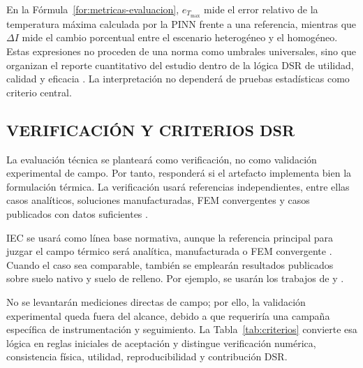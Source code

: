 \documentclass[11pt,a4paper,oneside]{report}
\begin{document}
En la Fórmula~\ref{for:metricas-evaluacion}, $e_{T_{\max}}$ mide el error relativo de la temperatura máxima calculada por la PINN frente a una referencia, mientras que $\Delta I$ mide el cambio porcentual entre el escenario heterogéneo y el homogéneo. Estas expresiones no proceden de una norma como umbrales universales, sino que organizan el reporte cuantitativo del estudio dentro de la lógica DSR de utilidad, calidad y eficacia \parencite[350--351]{gregor2013}. La interpretación no dependerá de pruebas estadísticas como criterio central.

\subsection{VERIFICACIÓN Y CRITERIOS DSR}
\label{subsec:verificacion-dsr}

La evaluación técnica se planteará como verificación, no como validación experimental de campo. Por tanto, responderá si el artefacto implementa bien la formulación térmica. La verificación usará referencias independientes, entre ellas casos analíticos, soluciones manufacturadas, FEM convergentes y casos publicados con datos suficientes \parencite[3--4,93--99]{cigre2025}.

IEC se usará como línea base normativa, aunque la referencia principal para juzgar el campo térmico será analítica, manufacturada o FEM convergente \parencite[3--4,93--99]{cigre2025}. Cuando el caso sea comparable, también se emplearán resultados publicados sobre suelo nativo y suelo de relleno. Por ejemplo, se usarán los trabajos de \textcite[1,6--7]{khumalo2025} y \textcite[9--10,16]{kim2025}.

No se levantarán mediciones directas de campo; por ello, la validación experimental queda fuera del alcance, debido a que requeriría una campaña específica de instrumentación y seguimiento. La Tabla~\ref{tab:criterios} convierte esa lógica en reglas iniciales de aceptación y distingue verificación numérica, consistencia física, utilidad, reproducibilidad y contribución DSR.
\end{document}
